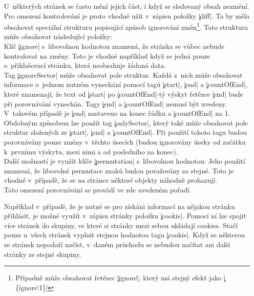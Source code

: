 U~některých stránek se často mění jejich část, i když se sledovaný obsah nezmění.
Pro omezení kontrolování je proto vhodné užít v~zápisu položky \c|diff|.
Ta by měla obsahovat speciální strukturu  popisující způsob ignorování změn\footnote{Případně může obsahovat řetězec \c|\"ignore\"|, který má stejný efekt jako \c|\{\"ignore\":1\}|}.
Tato struktura může obsahovat následující položky:\\
Klíč \c|ignore| s~libovolnou hodnotou znamená, že stránka se vůbec nebude kontrolovat na změny.
Toto je vhodné například když se jedná pouze o~přihlašovací stránku, která neobsahuje žádaná data.\\
Tag \c|ignoreSector| může obsahovat pole struktur.
Každá z~nich může obsahovat informace o~jednom nutném vynechání pomocí tagů \c|start|, \c|end| a \c|countOfEnd|,
které znamenají, že text od \c|start| po \c|countOfEnd|-tý výskyt řetězce \c|end| bude při porovnávání vynechán.
Tagy \c|end| a \c|countOfEnd| nemusí být uvedeny. V~takovém případě je \c|end| nastaveno na konec řádku a \c|countOfEnd| na 1.
\\
Obdobným způsobem lze použít tag \c|onlySector|, který také může obsahovat pole struktur složených ze \c|start|, \c|end| a \c|countOfEnd|.
Při použití tohoto tagu budou porovnávány pouze změny v~těchto úsecích (budou ignorovány úseky od začátku k~prvnímu výskytu, mezi nimi a od posledního na konec).
\\
Další možností je využít klíče \c|permutation| s~libovolnou hodnotou.
Jeho použití znamená, že libovolné permutace znaků budou považovány za stejné.
Toto je vhodné v~případě, že se na stránce některé objekty náhodně prohazují.
\\
Tato omezení porovnávání se provádí ve zde uvedeném pořadí.




Například v~případě, že je nutné se pro získáni informací na nějakou stránku přihlásit, je možné využít v~zápisu stránky položku \c|cookie|.
Pomocí ní lze spojit více stránek do skupiny, ve které si stránky mezi sebou ukládají cookies.
Stačí pouze u~všech stránek vyplnit stejnou hodnotou tagu \c|cookie|.
Když se některou ze stránek nepodaří načíst, v~daném průchodu se nebudou načítat ani další stránky ze stejné skupiny.

